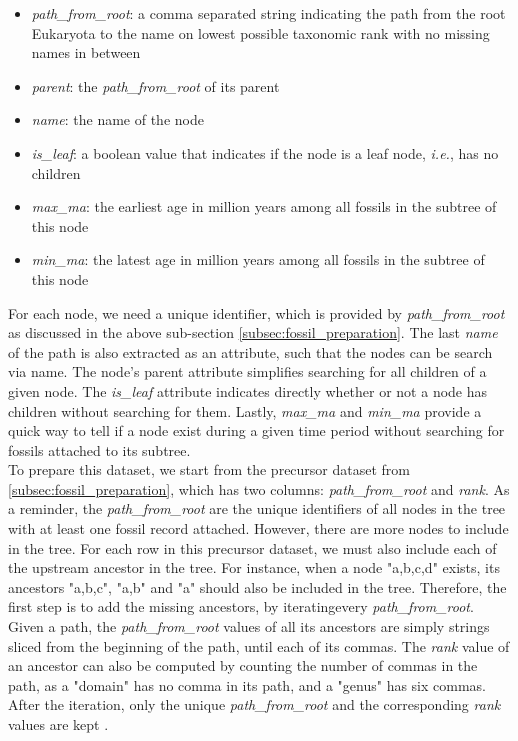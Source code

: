 \documentclass[11pt, a4paper,oneside,chapterprefix=false]{scrbook}
\begin{document}
\begin{itemize}
	\item \textit{path\_from\_root}: a comma separated string indicating the path from the root Eukaryota to the name on lowest possible taxonomic rank with no missing names in between
	\item \textit{parent}: the \textit{path\_from\_root} of its parent
	\item \textit{name}: the name of the node
	\item \textit{is\_leaf}: a boolean value that indicates if the node is a leaf node, \textit{i.e.}, has no children
	\item \textit{max\_ma}: the earliest age in million years among all fossils in the subtree of this node
	\item \textit{min\_ma}: the latest age in million years among all fossils in the subtree of this node
\end{itemize}

For each node, we need a unique identifier, which is provided by \emph{path\_from\_root} as discussed in the above sub-section \ref{subsec:fossil_preparation}. The last \emph{name} of the path is also extracted as an attribute, such that the nodes can be search via name. The node's parent attribute simplifies searching for all children of a given node. The \emph{is\_leaf} attribute indicates directly whether or not a node has children without searching for them. Lastly, \emph{max\_ma} and \emph{min\_ma} provide a quick way to tell if a node exist during a given time period without searching for fossils attached to its subtree. \\

To prepare this dataset, we start from the precursor dataset from \ref{subsec:fossil_preparation}, which has two columns: \emph{path\_from\_root} and \emph{rank}. As a reminder, the \emph{path\_from\_root} are the unique identifiers of all nodes in the tree with at least one fossil record attached. However, there are more nodes to include in the tree. For each row in this precursor dataset, we must also include each of the upstream ancestor in the tree. For instance, when a node "a,b,c,d" exists, its ancestors "a,b,c", "a,b" and "a" should also be included in the tree. Therefore, the first step is to add the missing ancestors, by iteratingevery \emph{path\_from\_root}. Given a path, the \emph{path\_from\_root} values of all its ancestors are simply strings sliced from the beginning of the path, until each of its commas. The \emph{rank} value of an ancestor can also be computed by counting the number of commas in the path, as a "domain" has no comma in its path, and a "genus" has six commas. After the iteration, only the unique \emph{path\_from\_root} and the corresponding \emph{rank} values are kept .\\
\end{document}

